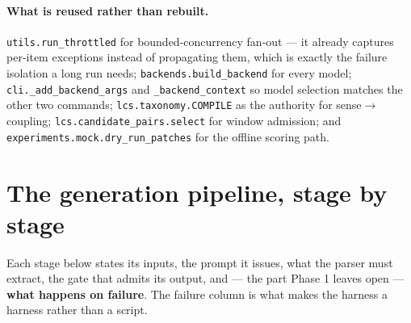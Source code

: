\documentclass[11pt]{article}
\begin{document}
\paragraph{What is reused rather than rebuilt.} \texttt{utils.run\_throttled} for bounded-concurrency
fan-out --- it already captures per-item exceptions instead of propagating them, which is exactly
the failure isolation a long run needs; \texttt{backends.build\_backend} for every model;
\texttt{cli.\_add\_backend\_args} and \texttt{\_backend\_context} so model selection matches the
other two commands; \texttt{lcs.taxonomy.COMPILE} as the authority for sense$\to$coupling;
\texttt{lcs.candidate\_pairs.select} for window admission; and
\texttt{experiments.mock.dry\_run\_patches} for the offline scoring path.

\section{The generation pipeline, stage by stage}
\label{sec:pipeline}

Each stage below states its inputs, the prompt it issues, what the parser must extract, the gate
that admits its output, and --- the part Phase 1 leaves open --- \textbf{what happens on failure}.
The failure column is what makes the harness a harness rather than a script.
\end{document}
